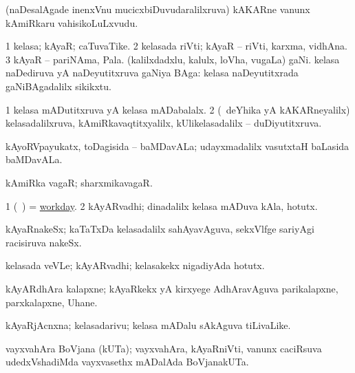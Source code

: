 \bentry
{} 
\gl{\nA}
\expl{}
\bmng
(naDesalAgade inenxVnu mucicxbiDuvudaralilxruva) kAKARne \mo vanunx kAmiRkaru vahisikoLuLxvudu. 
\emng
\eentry

\bentry
{} 
\gl{\nA}
\expl{}
\bmng
\bnum
\num{1} kelasa; kAyaR; caTuvaTike. 
\num{2} kelasada riVti; kAyaR -- riVti, karxma, vidhAna. 
\num{3} kAyaR -- pariNAma, Pala. 
\banum
{} (kalilxdadxlu, kalulx, loVha, \mo vugaLa) gaNi. 
 kelasa naDediruva yA naDeyutitxruva gaNiya BAga:  kelasa naDeyutitxrada gaNiBAgadalilx sikikxtu. 
\eanum
\numie
\enum
\emng
\eentry

\bentry
{} 
\gl{\gu}
\expl{}
\bmng
\bnum
\num{1} kelasa mADutitxruva yA kelasa mADabalalx. 
\num{2} (\kanmu\ deYhika yA kAKARneyalilx) kelasadalilxruva, kAmiRkavaqtitxyalilx, kUlikelasadalilx -- duDiyutitxruva. 
\enum
\emng
\eentry

\bentry
{} 
\gl{\nA}
\expl{}
\bmng
kAyoRVpayukatx, toDagisida -- baMDavALa; udayxmadalilx vasutxtaH baLasida baMDavALa. 
\emng
\eentry

\bentry
{} 
\gl{\nA}
\expl{}
\bmng
kAmiRka vagaR; sharxmikavagaR. 
\emng
\eentry

\bentry
{} 
\gl{\nA}
\expl{}
\bmng
\bnum
\num{1} (\kanmu\ \birx) = \hyperlink{workday}{workday}. 
\num{2} kAyARvadhi; dinadalilx kelasa mADuva kAla, hotutx. 
\enum
\emng
\eentry

\bentry
{} 
\gl{\nA}
\expl{}
\bmng
kAyaRnakeSx; kaTaTxDa kelasadalilx sahAyavAguva, sekxVlfge sariyAgi racisiruva nakeSx. 
\emng
\eentry

\bentry
{} 
\gl{\nA}
\expl{}
\bmng
kelasada veVLe; kAyARvadhi; kelasakekx nigadiyAda hotutx. 
\emng
\eentry

\bentry
{} 
\gl{\nA}
\expl{}
\bmng
kAyARdhAra kalapxne; kAyaRkekx yA kirxyege AdhAravAguva parikalapxne, parxkalapxne, Uhane. 
\emng
\eentry

\bentry
{} 
\gl{\nA}
\expl{}
\bmng
kAyaRjAcnxna; kelasadarivu; kelasa mADalu sAkAguva tiLivaLike. 
\emng
\eentry

\bentry
{} 
\gl{\nA}
\expl{}
\bmng
vayxvahAra BoVjana (kUTa); vayxvahAra, kAyaRniVti, \mo vanunx caciRsuva udedxVshadiMda vayxvasethx mADalAda BoVjanakUTa. 
\emng
\eentry

